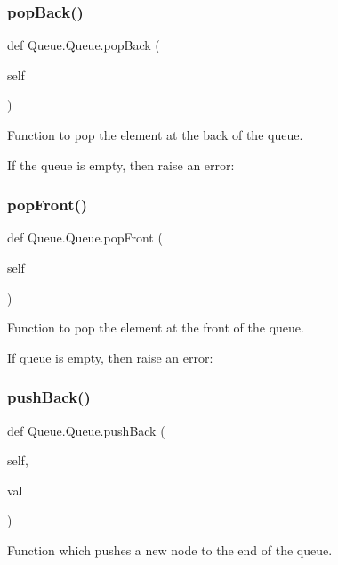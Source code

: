 \subsubsection{\texorpdfstring{pop\+Back()}{popBack()}}
{\footnotesize\ttfamily def Queue.\+Queue.\+pop\+Back (\begin{DoxyParamCaption}\item[{}]{self }\end{DoxyParamCaption})}



Function to pop the element at the back of the queue. 

If the queue is empty, then raise an error\+: \mbox{\label{class_queue_1_1_queue_aa2cd3a51ee6600ca226f7c43623d6ede}} 
\subsubsection{\texorpdfstring{pop\+Front()}{popFront()}}
{\footnotesize\ttfamily def Queue.\+Queue.\+pop\+Front (\begin{DoxyParamCaption}\item[{}]{self }\end{DoxyParamCaption})}



Function to pop the element at the front of the queue. 

If queue is empty, then raise an error\+: \mbox{\label{class_queue_1_1_queue_a6333268eb174c6fda6f9574e951710b2}} 
\subsubsection{\texorpdfstring{push\+Back()}{pushBack()}}
{\footnotesize\ttfamily def Queue.\+Queue.\+push\+Back (\begin{DoxyParamCaption}\item[{}]{self,  }\item[{}]{val }\end{DoxyParamCaption})}



Function which pushes a new node to the end of the queue. 



